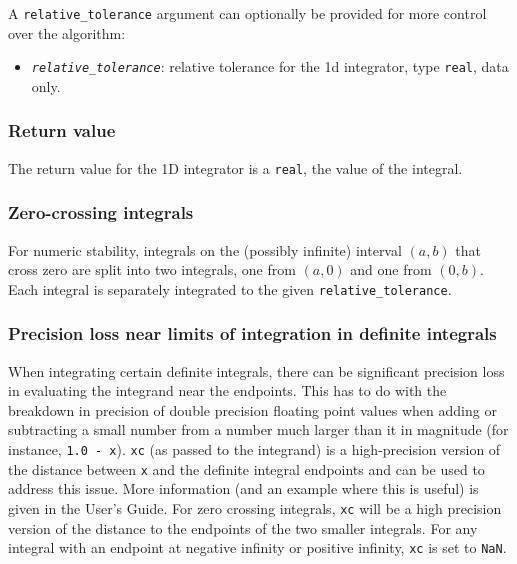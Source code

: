 \documentclass[
  10pt,
]{book}
\providecommand{\tightlist}{%
  \setlength{\itemsep}{0pt}\setlength{\parskip}{0pt}}
\begin{document}
A \texttt{relative\_tolerance} argument can optionally be provided for more control over the algorithm:

\begin{itemize}
\tightlist
\item
  \emph{\texttt{relative\_tolerance}}: relative tolerance for the 1d integrator, type \texttt{real}, data only.
\end{itemize}

\hypertarget{return-value-1}{%
\subsubsection{Return value}\label{return-value-1}}

The return value for the 1D integrator is a \texttt{real}, the value of the integral.

\hypertarget{zero-crossing}{%
\subsubsection{Zero-crossing integrals}\label{zero-crossing}}

For numeric stability, integrals on the (possibly infinite) interval \((a, b)\) that cross zero are split into two integrals, one from \((a, 0)\) and one from \((0, b)\). Each integral is separately integrated to the given \texttt{relative\_tolerance}.

\hypertarget{precision-loss}{%
\subsubsection{Precision loss near limits of integration in definite integrals}\label{precision-loss}}

When integrating certain definite integrals, there can be significant precision loss in evaluating the integrand near the endpoints. This has to do with the breakdown in precision of double precision floating point values when adding or subtracting a small number from a number much larger than it in magnitude (for instance, \texttt{1.0\ -\ x}). \texttt{xc} (as passed to the integrand) is a high-precision version of the distance between \texttt{x} and the definite integral endpoints and can be used to address this issue. More information (and an example where this is useful) is given in the User's Guide. For zero crossing integrals, \texttt{xc} will be a high precision version of the distance to the endpoints of the two smaller integrals. For any integral with an endpoint at negative infinity or positive infinity, \texttt{xc} is set to \texttt{NaN}.
\end{document}
